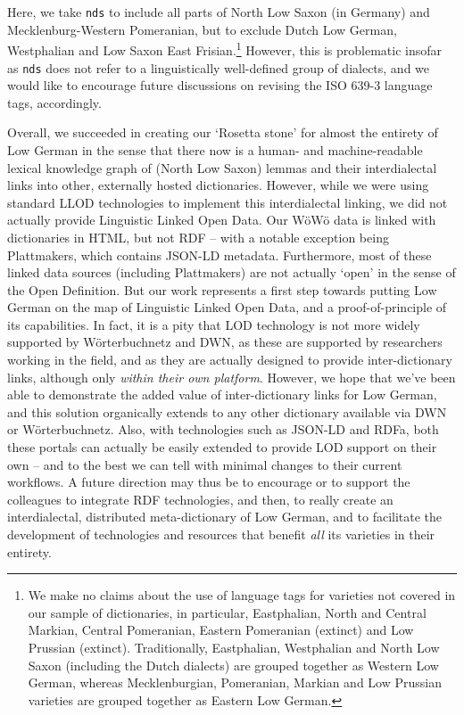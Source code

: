\documentclass[11pt]{article}
\newcommand{\code}[1]{\texttt{#1}} %
\begin{document}
Here, we take \code{nds} to include all parts of North Low Saxon (in Germany) and Mecklenburg-Western Pomeranian, but to exclude Dutch Low German, Westphalian and Low Saxon East Frisian.\footnote{
  We make no claims about the use of language tags for varieties not covered in our sample of dictionaries, in particular, Eastphalian, North and Central Markian, Central Pomeranian, Eastern Pomeranian (extinct) and Low Prussian (extinct). Traditionally, Eastphalian, Westphalian and North Low Saxon (including the Dutch dialects) are grouped together as Western Low German, whereas Mecklenburgian, Pomeranian, Markian and Low Prussian varieties are grouped together as Eastern Low German.
}
However, this is problematic insofar as \code{nds} does not refer to a linguistically well-defined group of dialects, and we would like to encourage future discussions on revising the ISO 639-3 language tags, accordingly.

Overall, we succeeded in creating our `Rosetta stone' for almost the entirety of Low German in the sense that there now is a human- and machine-readable lexical knowledge graph of (North Low Saxon) lemmas and their interdialectal links into other, externally hosted dictionaries.
However, while we were using standard LLOD technologies to implement this interdialectal linking, we did not actually provide Linguistic Linked Open Data. Our WöWö data is linked with dictionaries in HTML, but not RDF -- with a notable exception being Plattmakers, which contains JSON-LD metadata. 
Furthermore, most of these linked data sources (including Plattmakers) are not actually `open' in the sense of the Open Definition. 
But our work represents a first step towards putting Low German on the map of Linguistic Linked Open Data, and a proof-of-principle of its capabilities.
In fact, it is a pity that LOD technology is not more widely supported by Wörterbuchnetz and DWN, as these are supported by researchers working in the field, and as they are actually designed to provide inter-dictionary links, although only \emph{within their own platform}. 
However, we hope that we've been able to demonstrate the added value of inter-dictionary links for Low German, and this solution organically extends to any other dictionary available via DWN or Wörterbuchnetz. Also, with technologies such as JSON-LD and RDFa, both these portals can actually be easily extended to provide LOD support on their own -- and to the best we can tell with minimal changes to their current workflows.
A future direction may thus be to encourage or to support the colleagues to integrate RDF technologies, and then, to really create an interdialectal, distributed meta-dictionary of Low German, and to facilitate the development of technologies and resources that benefit \emph{all} its varieties in their entirety.
\end{document}
